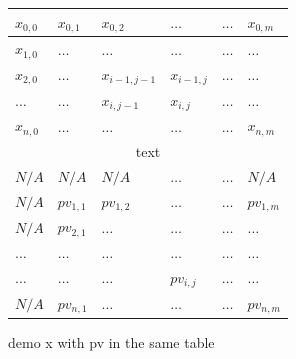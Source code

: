 \begin{figure}
	\centering
	

		\begin{tabularx}{\linewidth}{|*{6}{X|}} 
		\hline
		$x_{0, 0}$ & $x_{0, 1}$ & $x_{0, 2}$                         & $\dots$                           & $\dots$ & $x_{0, m}$ \\ \hline
		$x_{1, 0}$ & $\dots$    & $\dots$                            & $\dots$                           & $\dots$ & $\dots$    \\ \hline 
		$x_{2, 0}$ & $\dots$    & \cellcolor{blue!10} $x_{i-1, j-1}$ & \cellcolor{blue!10}$x_{i - 1, j}$ & $\dots$ & $\dots$    \\ \hline 
		$\dots$    & $\dots$    & \cellcolor{blue!10}$x_{i, j - 1}$  & \cellcolor{blue!10}$x_{i, j}$     & $\dots$ & $\dots$    \\ \hline 
		$x_{n, 0}$ & $\dots$    & $\dots$                            & $\dots$                           & $\dots$ & $x_{n, m}$ \\ \hline 
		
		\multicolumn{6}{c}{text} \\

		\rowcolor{lightgray}
		\cellcolor{lightgray}$N/A$   & $N/A$       & $N/A$       & $\dots$                        & $\dots$ & $N/A$       \\ \hline
		\cellcolor{lightgray}$N/A$   & $pv_{1, 1}$ & $pv_{1, 2}$ & $\dots$                        & $\dots$ & $pv_{1, m}$ \\ \hline
		\cellcolor{lightgray}$N/A$   & $pv_{2, 1}$ & $\dots$     & $\dots$                        & $\dots$ & $\dots$     \\ \hline 
		\cellcolor{lightgray}$\dots$ & $\dots$     & $\dots$     & $\dots$                        & $\dots$ & $\dots$     \\ \hline 
		\cellcolor{lightgray}$\dots$ & $\dots$     & $\dots$     & \cellcolor{blue!10}$pv_{i, j}$ & $\dots$ & $\dots$     \\ \hline 
		\cellcolor{lightgray}$N/A$   & $pv_{n, 1}$ & $\dots$     & $\dots$                        & $\dots$ & $pv_{n, m}$ \\ \hline 
	\end{tabularx}
	
	
	\caption{demo x with pv in the same table}
\end{figure}




